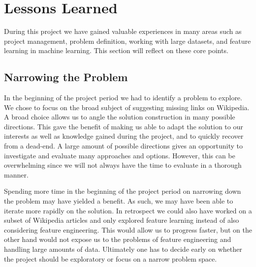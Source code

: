 \section{Lessons Learned}

During this project we have gained valuable experiences in many areas such as project management, problem definition, working with large datasets, and feature learning in machine learning. This section will reflect on these core points. 


\subsection{Narrowing the Problem}
In the beginning of the project period we had to identify a problem to explore. We chose to focus on the broad subject of suggesting missing links on Wikipedia. A broad choice allows us to angle the solution construction in many possible directions.  This gave the benefit of making us able to adapt the solution to our interests as well as knowledge gained during the project, and to quickly recover from a dead-end. A large amount of possible directions gives an opportunity to investigate and evaluate many approaches and options. However, this can be overwhelming since we will not always have the time to evaluate in a thorough manner.

Spending more time in the beginning of the project period on narrowing down the problem may have yielded a benefit. As such, we may have been able to iterate more rapidly on the solution. In retrospect we could also have worked on a subset of Wikipedia articles and only explored feature learning instead of also considering feature engineering. This would allow us to progress faster, but on the other hand would not expose us to the problems of feature engineering and handling large amounts of data. Ultimately one has to decide early on whether the project should be exploratory or focus on a narrow problem space.


